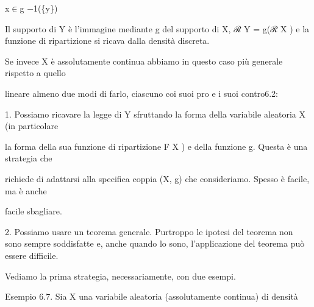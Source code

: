 \documentclass[a4paper,portrait,12pt]{article}
\begin{document}
\begin{flushleft}
x$\in$g $-$1(\{y\})
\end{flushleft}





\begin{flushleft}
Il supporto di Y \`{e} l'immagine mediante g del supporto di X, ℛ Y = g(ℛ X ) e la funzione di ripartizione si ricava dalla densit\`{a} discreta.
\end{flushleft}


\begin{flushleft}
Se invece X \`{e} assolutamente continua abbiamo in questo caso più generale rispetto a quello
\end{flushleft}


\begin{flushleft}
lineare almeno due modi di farlo, ciascuno coi suoi pro e i suoi contro6.2:
\end{flushleft}


\begin{flushleft}
1. Possiamo ricavare la legge di Y sfruttando la forma della variabile aleatoria X (in particolare
\end{flushleft}


\begin{flushleft}
la forma della sua funzione di ripartizione F X ) e della funzione g. Questa \`{e} una strategia che
\end{flushleft}


\begin{flushleft}
richiede di adattarsi alla specifica coppia (X, g) che consideriamo. Spesso \`{e} facile, ma \`{e} anche
\end{flushleft}


\begin{flushleft}
facile sbagliare.
\end{flushleft}


\begin{flushleft}
2. Possiamo usare un teorema generale. Purtroppo le ipotesi del teorema non sono sempre soddisfatte e, anche quando lo sono, l'applicazione del teorema pu\`{o} essere difficile.
\end{flushleft}


\begin{flushleft}
Vediamo la prima strategia, necessariamente, con due esempi.
\end{flushleft}


\begin{flushleft}
Esempio 6.7. Sia X una variabile aleatoria (assolutamente continua) di densit\`{a}
\end{flushleft}
\end{document}
